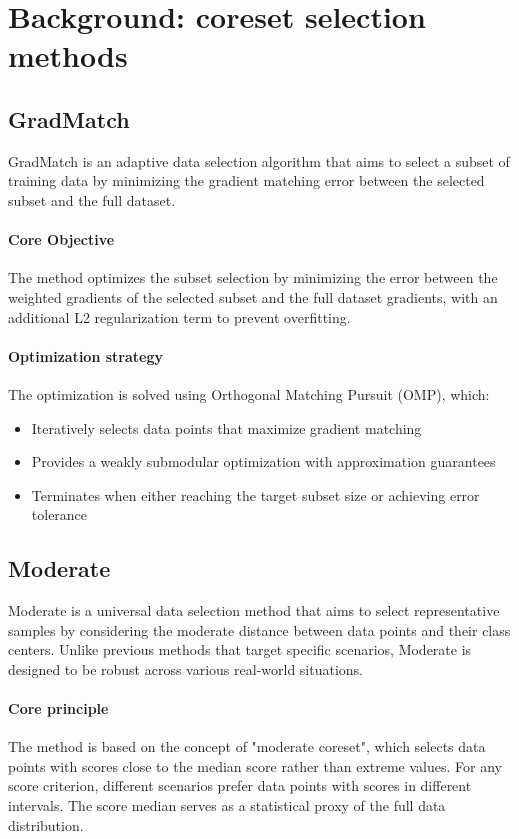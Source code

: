 \section{Background: coreset selection methods}
\label{appendix:used_selection_method}
\subsection{GradMatch}
GradMatch is an adaptive data selection algorithm that aims to select a subset of training data by minimizing the gradient matching error between the selected subset and the full dataset.

\paragraph{Core Objective} The method optimizes the subset selection by minimizing the error between the weighted gradients of the selected subset and the full dataset gradients, with an additional L2 regularization term to prevent overfitting.

\paragraph{Optimization strategy}
The optimization is solved using Orthogonal Matching Pursuit (OMP), which:
\begin{itemize}
    \item Iteratively selects data points that maximize gradient matching
    \item Provides a weakly submodular optimization with approximation guarantees
    \item Terminates when either reaching the target subset size or achieving error tolerance
\end{itemize}

\subsection{Moderate}
Moderate is a universal data selection method that aims to select representative samples by considering the moderate distance between data points and their class centers. Unlike previous methods that target specific scenarios, Moderate is designed to be robust across various real-world situations.


\paragraph{Core principle} The method is based on the concept of "moderate coreset", which selects data points with scores close to the median score rather than extreme values. For any score criterion, different scenarios prefer data points with scores in different intervals. The score median serves as a statistical proxy of the full data distribution.

